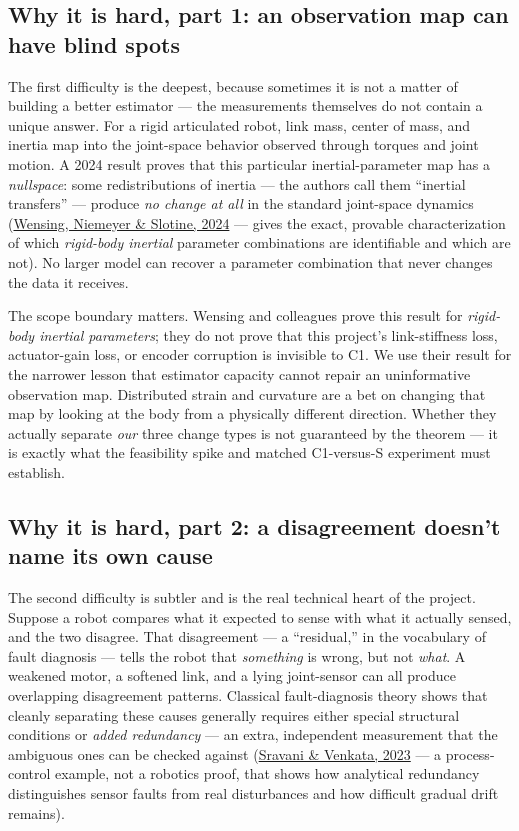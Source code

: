 \documentclass[12pt]{article}
\begin{document}
\subsection{Why it is hard, part 1: an observation map can have blind spots}

The first difficulty is the deepest, because sometimes it is not a matter of building a better estimator --- the measurements themselves do not contain a unique answer. For a rigid articulated robot, link mass, center of mass, and inertia map into the joint-space behavior observed through torques and joint motion. A 2024 result proves that this particular inertial-parameter map has a \emph{nullspace}: some redistributions of inertia --- the authors call them ``inertial transfers'' --- produce \emph{no change at all} in the standard joint-space dynamics (\href{https://doi.org/10.1177/02783649241258215}{Wensing, Niemeyer \& Slotine, 2024} --- gives the exact, provable characterization of which \emph{rigid-body inertial} parameter combinations are identifiable and which are not). No larger model can recover a parameter combination that never changes the data it receives.

The scope boundary matters. Wensing and colleagues prove this result for \emph{rigid-body inertial parameters}; they do not prove that this project's link-stiffness loss, actuator-gain loss, or encoder corruption is invisible to C1. We use their result for the narrower lesson that estimator capacity cannot repair an uninformative observation map. Distributed strain and curvature are a bet on changing that map by looking at the body from a physically different direction. Whether they actually separate \emph{our} three change types is not guaranteed by the theorem --- it is exactly what the feasibility spike and matched C1-versus-S experiment must establish.

\subsection{Why it is hard, part 2: a disagreement doesn't name its own cause}

The second difficulty is subtler and is the real technical heart of the project. Suppose a robot compares what it expected to sense with what it actually sensed, and the two disagree. That disagreement --- a ``residual,'' in the vocabulary of fault diagnosis --- tells the robot that \emph{something} is wrong, but not \emph{what}. A weakened motor, a softened link, and a lying joint-sensor can all produce overlapping disagreement patterns. Classical fault-diagnosis theory shows that cleanly separating these causes generally requires either special structural conditions or \emph{added redundancy} --- an extra, independent measurement that the ambiguous ones can be checked against (\href{https://doi.org/10.3390/s23146633}{Sravani \& Venkata, 2023} --- a process-control example, not a robotics proof, that shows how analytical redundancy distinguishes sensor faults from real disturbances and how difficult gradual drift remains).
\end{document}
